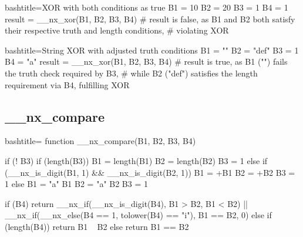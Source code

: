 \begin{NexCodeBox}{bash}{title={XOR with both conditions as true}}
	B1 = 10
	B2 = 20
	B3 = 1
	B4 = 1
	result = __nx_xor(B1, B2, B3, B4)
	# result is false, as B1 and B2 both satisfy their respective truth and length conditions, 
	# violating XOR
\end{NexCodeBox}

\begin{NexCodeBox}{bash}{title={String XOR with adjusted truth conditions}}
	B1 = ""
	B2 = "def"
	B3 = 1
	B4 = "a"
	result = __nx_xor(B1, B2, B3, B4)
	# result is true, as B1 ("") fails the truth check required by B3, 
	# while B2 ("def") satisfies the length requirement via B4, fulfilling XOR
\end{NexCodeBox}

\newpage
\subsection{__nx_compare}
\label{__nx_compare}
\begin{NexCodeBox}{bash}{title={}}
function __nx_compare(B1, B2, B3, B4) {
	if (! B3) {
		if (length(B3)) {
			B1 = length(B1)
			B2 = length(B2)
			B3 = 1
		} else if (__nx_is_digit(B1, 1) && __nx_is_digit(B2, 1)) {
			B1 = +B1
			B2 = +B2
			B3 = 1
		} else {
			B1 = "a" B1
			B2 = "a" B2
			B3 = 1
		}
	}

	if (B4) {
		return __nx_if(__nx_is_digit(B4), B1 > B2, B1 < B2) || __nx_if(__nx_else(B4 == 1, tolower(B4) == "i"), B1 == B2, 0)
	} else if (length(B4)) {
		return B1 ~ B2
	} else {
		return B1 == B2
	}
}
\end{NexCodeBox}

